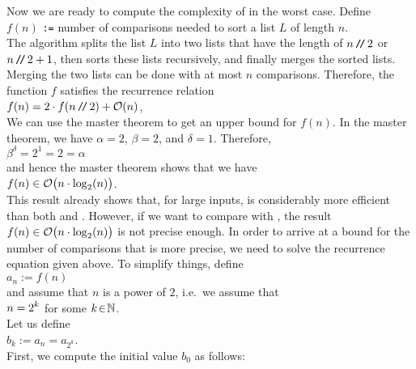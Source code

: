\noindent
Now we are ready to compute the complexity of  in the worst case.  Define
\\[0.2cm]
\hspace*{1.3cm}
$f(n)$  \texttt{:=} number of comparisons needed to sort a list $L$ of length $n$.
\\[0.2cm]
The algorithm  
splits the list $L$ into two lists that have the length of $n\mbox{\,\texttt{/}$\!$\texttt{/}\,} 2$ or $n\mbox{\,\texttt{/}$\!$\texttt{/}\,} 2+1$, then sorts
these lists recursively, and finally merges the sorted lists.  Merging the two lists can be done with
at most $n$ comparisons.  Therefore, the function $f$ satisfies the recurrence relation
\\[0.2cm]
\hspace*{1.3cm}
$f(n) = 2 \cdot f(n \mbox{\,\texttt{/}$\!$\texttt{/}\,}  2) + \mathcal{O}(n)$,
\\[0.2cm]
We can use the master theorem to get an upper bound for $f(n)$.  In the master theorem, we have
$\alpha = 2$, $\beta = 2$, and $\delta = 1$. Therefore,
\\[0.2cm]
\hspace*{1.3cm}
$\beta^\delta = 2^1 = 2 = \alpha$
\\[0.2cm]
and hence the master theorem shows that we have
\\[0.2cm]
\hspace*{1.3cm}
$f(n) \in \mathcal{O}\bigl(n \cdot \log_2(n) \bigr)$.
\\[0.2cm]
This result already shows that, for large inputs,  is considerably more efficient
than both  and .  However, if we want to compare
 with , the result $f(n) \in \mathcal{O}\bigl(n \cdot \log_2(n) \bigr)$ is
not precise enough.  In order to arrive at a bound for the number of comparisons that is more precise,
we need to solve the recurrence equation given above.  To simplify things,  define
\\[0.2cm]
\hspace*{1.3cm}
$a_n := f(n)$ 
\\[0.2cm]
and assume that $n$ is a power of $2$, i.e.~we assume that
\\[0.2cm]
\hspace*{1.3cm}
$\displaystyle n = 2^k$ \qquad for some $k \!\in\! \mathbb{N}$.
\\[0.2cm]
Let us define
\\[0.2cm]
\hspace*{1.3cm}
$b_k := a_n = a_{2^k}$.
\\[0.2cm]
First, we compute the initial value $b_0$ as follows:
